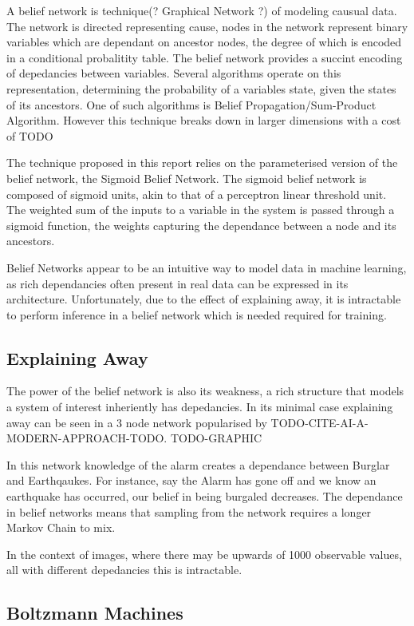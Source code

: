   A belief network is technique(? Graphical Network ?) of modeling causual data. The network is directed representing cause, nodes in the network represent binary variables which are dependant on ancestor nodes, the degree of which is encoded in a conditional probalitity table. The belief network provides a succint encoding of depedancies between variables. Several algorithms operate on this representation, determining the probability of a variables state, given the states of its ancestors. One of such algorithms is Belief Propagation/Sum-Product Algorithm. However this technique breaks down in larger dimensions with a cost of TODO


  The technique proposed in this report relies on the parameterised version of the belief network, the Sigmoid Belief Network. The sigmoid belief network is composed of sigmoid units, akin to that of a perceptron linear threshold unit. The weighted sum of the inputs to a variable in the system is passed through a sigmoid function, the weights capturing the dependance between a node and its ancestors.

  Belief Networks appear to be an intuitive way to model data in machine learning, as rich dependancies often present in real data can be expressed in its architecture. Unfortunately, due to the effect of explaining away, it is intractable to perform inference in a belief network which is needed required for training.

  \subsection{Explaining Away}

  The power of the belief network is also its weakness, a rich structure that models a system of interest inheriently has depedancies. In its minimal case explaining away can be seen in a 3 node network popularised by TODO-CITE-AI-A-MODERN-APPROACH-TODO. TODO-GRAPHIC

  In this network knowledge of the alarm creates a dependance between Burglar and Earthqaukes. For instance, say the Alarm has gone off and we know an earthquake has occurred, our belief in being burgaled decreases. The dependance in belief networks means that sampling from the network requires a longer Markov Chain to mix.

  In the context of images, where there may be upwards of 1000 observable values, all with different depedancies this is intractable.

\subsection{Boltzmann Machines}

